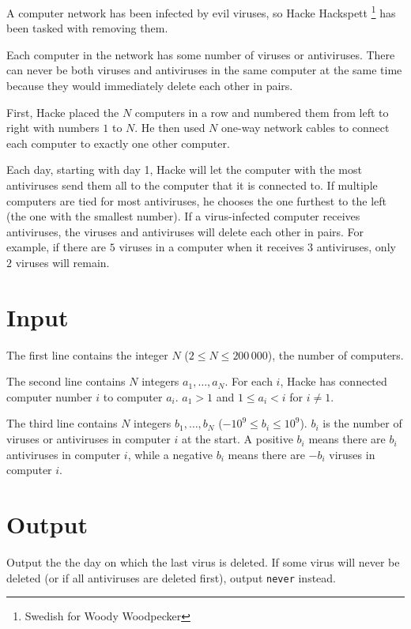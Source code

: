 
A computer network has been infected by evil viruses, so Hacke Hackspett \footnote{Swedish for Woody Woodpecker} has been tasked with removing them.

Each computer in the network has some number of viruses or antiviruses. There can never be both viruses and antiviruses in the same computer at the same time because they would immediately delete each other in pairs.

First, Hacke placed the $N$ computers in a row and numbered them from left to right with numbers $1$ to $N$. He then used $N$ one-way network cables to connect each computer to exactly one other computer.

Each day, starting with day 1, Hacke will let the computer with the most antiviruses send them all to the computer that it is connected to. If multiple computers are tied for most antiviruses, he chooses the one furthest to the left (the one with the smallest number). If a virus-infected computer receives antiviruses, the viruses and antiviruses will delete each other in pairs. For example, if there are $5$ viruses in a computer when it receives $3$ antiviruses, only $2$ viruses will remain.

\section*{Input}
The first line contains the integer $N$ ($2 \leq N \leq 200\,000$), the number of computers.

The second line contains $N$ integers $a_1, \dots, a_N$. For each $i$, Hacke has connected computer number $i$ to computer $a_i$. $a_1 > 1$ and $1 \leq a_i < i$ for $i \neq 1$.

The third line contains $N$ integers $b_1, \dots, b_N$ ($-10^9 \leq b_i \leq 10^9$). $b_i$ is the number of viruses or antiviruses in computer $i$ at the start. A positive $b_i$ means there are $b_i$ antiviruses in computer $i$, while a negative $b_i$ means there are $-b_i$ viruses in computer $i$.

\section*{Output}
Output the the day on which the last virus is deleted. If some virus will never be deleted (or if all antiviruses are deleted first), output \texttt{never} instead.
